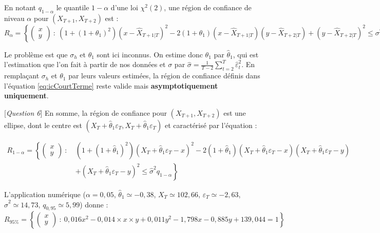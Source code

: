 \documentclass[french]{article}
\begin{document}
En notant \(q_{1- \alpha}\) le quantile \(1- \alpha\) d'une loi \({\chi}^2(2)\), une région de confiance de niveau \(\alpha\) pour \((X_{T+1},X_{T+2})\) est :
\begin{equation}
R_\alpha=\left\{ 
\begin{pmatrix}
    x \\ y
\end{pmatrix}\: :\:
(1+(1+\theta_1)^2)(x-\widehat X_{T+1\vert T})^2-2(1+\theta_1)(x-\widehat X_{T+1\vert T})(y-\widehat X_{T+2\vert T}) + (y-\widehat X_{T+2\vert T})^2\leq \sigma^2q_{1-\alpha} 
\right\}
\label{eq:icCourtTerme}
\end{equation}

Le problème est que \(\sigma_h\) et \(\theta_1\) sont ici inconnus.
On estime donc \(\theta_1\) par \(\widehat \theta_1\), qui est l'estimation que l'on fait à partir de nos données et \(\sigma\) par \(\widehat \sigma= \frac{1}{T-2}\sum_{t=2}^T\widehat\varepsilon_t^2\).
En remplaçant \(\sigma_h\) et \(\theta_1\) par leurs valeurs estimées, la région de confiance définis dans l'équation \eqref{eq:icCourtTerme} reste valide mais \textbf{asymptotiquement uniquement}.

{[}\emph{Question 6}{]} En somme, la région de confiance pour \((X_{T+1},X_{T+2})\) est une ellipse, dont le centre est \((X_T + \widehat\theta_1\varepsilon_T, X_T + \widehat\theta_1\varepsilon_T)\) et caractérisé par l'équation :

\begin{equation}
\begin{split}
R_{1-\alpha}=\left\{ 
\begin{pmatrix}
    x \\ y
\end{pmatrix}\: :\:\right.
&(1+(1+\widehat\theta_1)^2)( X_T + \widehat\theta_1\varepsilon_T-x)^2
-
2(1+\widehat\theta_1)(X_T + \widehat\theta_1\varepsilon_T-x)(X_T + \widehat\theta_1\varepsilon_T-y) \\
&+
(X_T + \widehat\theta_1\varepsilon_T-y)^2\leq \widehat\sigma^2q_{1-\alpha} 
\left.\right\}
\end{split}
\label{eq:icPrev}
\end{equation}

L'application numérique (\(\alpha = 0,05\), \(\widehat\theta_1\simeq -0,38\), \(X_T\simeq102,66\), \(\varepsilon_T\simeq-2,63\), \(\hat \sigma^2 \simeq 14,73\), \(q_{0,95} \simeq 5,99\)) donne :
\begin{equation}
R_{95\%}=\left\{ 
\begin{pmatrix}
    x \\ y
\end{pmatrix}\: :\:
0,016 x^2 - 0,014 \times x \times y + 0,011 y^2 - 1,798 x - 0,885 y + 139,044 = 1
\right\}
\label{eq:icApplique}
\end{equation}
\end{document}
